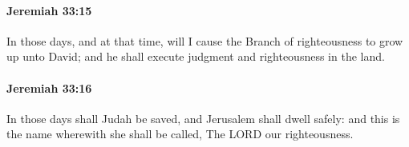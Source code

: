 		\paragraph{Jeremiah 33:15} %
			\label{JEREMIAH-33-15}

			In those days, and at that time, will I cause the Branch of righteousness to grow up unto David; and he shall execute judgment and righteousness in the land.


		\paragraph{Jeremiah 33:16} %
			\label{JEREMIAH-33-16}

			In those days shall Judah be saved, and Jerusalem shall dwell safely: and this is the name wherewith she shall be called, The LORD our righteousness.


